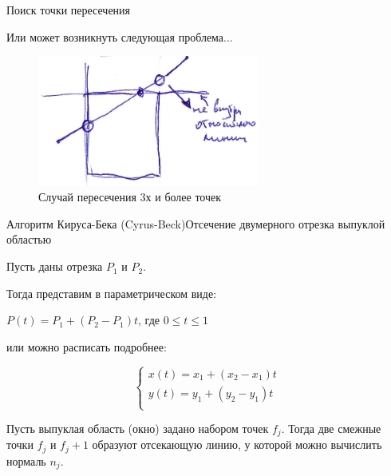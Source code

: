 \documentclass{beamer}
\begin{document}
	\begin{frame}{Поиск точки пересечения}

		Или может возникнуть следующая проблема...
		\begin{figure} 
			\includegraphics[width=0.65\textwidth]{images/example7.png}
			\caption{Случай пересечения 3х и более точек}
		\end{figure}
		

	\end{frame}

	\begin{frame}{Алгоритм Кируса-Бека (Cyrus-Beck)}{Отсечение двумерного отрезка выпуклой областью}


		Пусть даны отрезка $P_1$ и $P_2$. 

		Тогда представим в параметрическом виде:

		$P(t) = P_1 + (P_2 - P_1)t$, где $0 \leqslant  t \leqslant 1$

		или можно расписать подробнее:

		\[
		\begin{cases}
			x(t) = x_1 + (x_2 - x_1) t\\
			y(t) = y_1 + (y_2 - y_1) t\\
		\end{cases}	
		\]

		Пусть выпуклая область (окно) задано набором точек $f_j$. Тогда две смежные точки $f_j$ и $f_j+1$ образуют отсекающую линию, у которой можно вычислить нормаль $n_j$.

	\end{frame}
\end{document}
